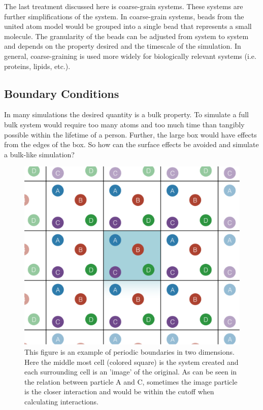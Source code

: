 The last treatment discussed here is coarse-grain systems. These systems are further simplifications of the system. In coarse-grain systems, beads from the united atom model would be grouped into a single bead that represents a small molecule. The granularity of the beads can be adjusted from system to system and depends on the property desired and the timescale of the simulation. In general, coarse-graining is used more widely for biologically relevant systems (i.e. proteins, lipids, etc.).
    
\subsection{Boundary Conditions}
In many simulations the desired quantity is a bulk property. To simulate a full bulk system would require too many atoms and too much time than tangibly possible within the lifetime of a person. Further, the large box would have effects from the edges of the box. So how can the surface effects be avoided and simulate a bulk-like simulation?

\begin{figure}
    \includegraphics[scale=0.5]{figures/pbc-center.pdf}
    \caption{This figure is an example of periodic boundaries in two dimensions. Here the middle most cell (colored square) is the system created and each surrounding cell is an 'image' of the original. As can be seen in the relation between particle A and C, sometimes the image particle is the closer interaction and would be within the cutoff when calculating interactions.}
    \label{fig:pbc}
\end{figure}

